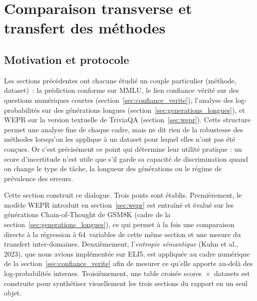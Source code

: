 %
%

\section{Comparaison transverse et transfert des méthodes}
\label{sec:transverse}

\subsection{Motivation et protocole}

Les sections précédentes ont chacune étudié un couple
particulier (méthode, dataset)~: la prédiction conforme sur MMLU, le
lien confiance--vérité sur des questions numériques courtes
(section~\ref{sec:confiance_verite}), l'analyse des log-probabilités
sur des générations longues (section~\ref{sec:generations_longues}), et
WEPR sur la version textuelle de TriviaQA (section~\ref{sec:wepr}). Cette structure permet une
analyse fine de chaque cadre, mais ne dit rien de la robustesse des
méthodes lorsqu'on les applique à un dataset pour lequel elles n'ont
pas été conçues. Or c'est précisément ce point qui détermine leur
utilité pratique : un score d'incertitude n'est utile que s'il garde sa
capacité de discrimination quand on change le type de tâche, la
longueur des générations ou le régime de prévalence des erreurs.

Cette section construit ce dialogue. Trois ponts sont établis. Premièrement,
le modèle WEPR introduit en section~\ref{sec:wepr} est entraîné et évalué
sur les générations Chain-of-Thought de GSM8K (cadre de la
section~\ref{sec:generations_longues}), ce qui permet à la fois une
comparaison directe à la régression à 64~variables de cette même
section et une mesure du transfert inter-domaines. Deuxièmement,
l'\emph{entropie sémantique} (Kuhn et al., 2023), que nous avions
implémentée sur ELI5, est appliquée au cadre numérique de la
section~\ref{sec:confiance_verite} afin de mesurer ce qu'elle apporte
au-delà des log-probabilités internes. Troisièmement, une table croisée scores~$\times$~datasets est
construite pour synthétiser visuellement les trois sections du rapport
en un seul objet.

